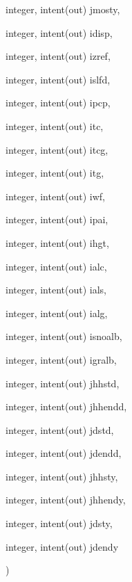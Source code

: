 {\begin{DoxyParamCaption}
\item[{integer, intent(out)}]{jmosty, }
\item[{integer, intent(out)}]{idisp, }
\item[{integer, intent(out)}]{izref, }
\item[{integer, intent(out)}]{islfd, }
\item[{integer, intent(out)}]{ipcp, }
\item[{integer, intent(out)}]{itc, }
\item[{integer, intent(out)}]{itcg, }
\item[{integer, intent(out)}]{itg, }
\item[{integer, intent(out)}]{iwf, }
\item[{integer, intent(out)}]{ipai, }
\item[{integer, intent(out)}]{ihgt, }
\item[{integer, intent(out)}]{ialc, }
\item[{integer, intent(out)}]{ials, }
\item[{integer, intent(out)}]{ialg, }
\item[{integer, intent(out)}]{isnoalb, }
\item[{integer, intent(out)}]{igralb, }
\item[{integer, intent(out)}]{jhhstd, }
\item[{integer, intent(out)}]{jhhendd, }
\item[{integer, intent(out)}]{jdstd, }
\item[{integer, intent(out)}]{jdendd, }
\item[{integer, intent(out)}]{jhhsty, }
\item[{integer, intent(out)}]{jhhendy, }
\item[{integer, intent(out)}]{jdsty, }
\item[{integer, intent(out)}]{jdendy}
\end{DoxyParamCaption}
)}\label{read__from__job__options_8f90_a4d9e6acff97bbaca36f374552dbca674}

